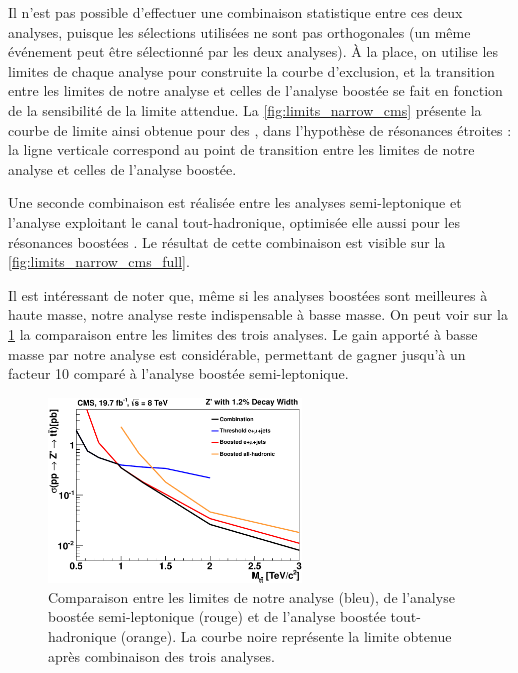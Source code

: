 Il n'est pas possible d'effectuer une combinaison statistique entre ces deux analyses, puisque les sélections utilisées ne sont pas orthogonales (un même événement peut être sélectionné par les deux analyses). À la place, on utilise les limites de chaque analyse pour construite la courbe d'exclusion, et la transition entre les limites de notre analyse et celles de l'analyse boostée se fait en fonction de la sensibilité de la limite attendue. La \cref{fig:limits_narrow_cms} présente la courbe de limite ainsi obtenue pour des \zprime, dans l'hypothèse de résonances étroites : la ligne verticale correspond au point de transition entre les limites de notre analyse et celles de l'analyse boostée.

Une seconde combinaison est réalisée entre les analyses semi-leptonique et l'analyse exploitant le canal tout-hadronique, optimisée elle aussi pour les résonances boostées \citep{Chatrchyan:1599045}. Le résultat de cette combinaison est visible sur la \cref{fig:limits_narrow_cms_full}.

Il est intéressant de noter que, même si les analyses boostées sont meilleures à haute masse, notre analyse reste indispensable à basse masse. On peut voir sur la \cref{fig:limits_comp} la comparaison entre les limites des trois analyses. Le gain apporté à basse masse par notre analyse est considérable, permettant de gagner jusqu'à un facteur 10 comparé à l'analyse boostée semi-leptonique.

\begin{figure}[tbp]
  \centering
  \includegraphics[width=0.6\textwidth]{chapitre7/figs/limit_comparison_narrow_resonances.pdf}
  \caption{Comparaison entre les limites de notre analyse (bleu), de l'analyse boostée semi-leptonique (rouge) et de l'analyse boostée tout-hadronique (orange). La courbe noire représente la limite obtenue après combinaison des trois analyses.}
  \label{fig:limits_comp}
\end{figure}


